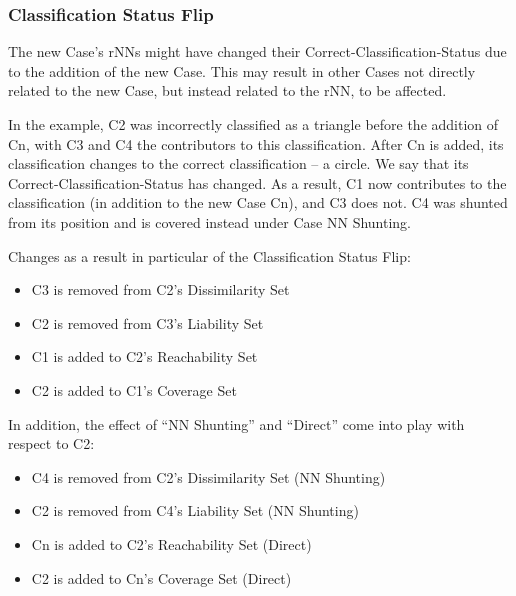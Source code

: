 \documentclass[a4paper,11pt]{report}
\begin{document}
\subsubsection{Classification Status Flip}
The new Case's rNNs might have changed their Correct-Classification-Status due to the addition of the new Case. This may result in other Cases not directly related to the new Case, but instead related to the rNN, to be affected.

In the example, C2 was incorrectly classified as a triangle before the addition of Cn, with C3 and C4 the contributors to this classification. After Cn is added, its classification changes to the correct classification – a circle. We say that its Correct-Classification-Status has changed. As a result, C1 now contributes to the classification (in addition to the new Case Cn), and C3 does not. C4 was shunted from its position and is covered instead under Case NN Shunting.

Changes as a result in particular of the Classification Status Flip:
\begin{itemize}
	\item C3 is removed from C2's Dissimilarity Set
	\item C2 is removed from C3's Liability Set
	\item C1 is added to C2's Reachability Set
	\item C2 is added to C1's Coverage Set
\end{itemize}

In addition, the effect of ``NN Shunting'' and ``Direct'' come into play with respect to C2:
\begin{itemize}
	\item C4 is removed from C2's Dissimilarity Set (NN Shunting)
	\item C2 is removed from C4's Liability Set (NN Shunting)
	\item Cn is added to C2's Reachability Set (Direct)
	\item C2 is added to Cn's Coverage Set (Direct)
\end{itemize}
\end{document}
